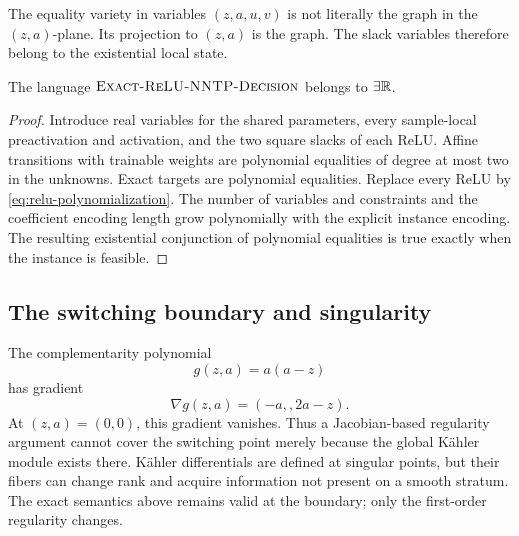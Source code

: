 \begin{remark}
The equality variety in variables \((z,a,u,v)\) is not literally the graph in
the \((z,a)\)-plane.  Its projection to \((z,a)\) is the graph.  The slack
variables therefore belong to the existential local state.
\end{remark}

\begin{proposition}
\label{prop:nntp-in-existsr}
The language \(\textnormal{\textsc{Exact-ReLU-NNTP-Decision}}\) belongs to \(\exists\mathbb{R}\).
\end{proposition}

\begin{proof}
Introduce real variables for the shared parameters, every sample-local
preactivation and activation, and the two square slacks of each ReLU.  Affine
transitions with trainable weights are polynomial equalities of degree at most
two in the unknowns.  Exact targets are polynomial equalities.  Replace every
ReLU by \cref{eq:relu-polynomialization}.  The number of variables and
constraints and the coefficient encoding length grow polynomially with the
explicit instance encoding.  The resulting existential conjunction of
polynomial equalities is true exactly when the instance is feasible.
\end{proof}

\subsection{The switching boundary and singularity}

The complementarity polynomial
\begin{equation}
  g(z,a)=a(a-z)
\end{equation}
has gradient
\begin{equation}
  \nabla g(z,a)=(-a,,2a-z).
\end{equation}
At \((z,a)=(0,0)\), this gradient vanishes.  Thus a Jacobian-based regularity
argument cannot cover the switching point merely because the global K\"ahler
module exists there.  K\"ahler differentials are defined at singular points,
but their fibers can change rank and acquire information not present on a
smooth stratum.  The exact semantics above remains valid at the boundary; only
the first-order regularity changes.
